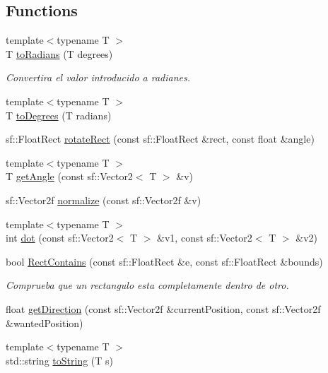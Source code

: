 \subsection*{Functions}
\begin{DoxyCompactItemize}
\item 
{\footnotesize template$<$typename T $>$ }\\T \hyperlink{namespaceant_1_1_utils_a5238d91325cffcd5d052d055767bfc36}{to\+Radians} (T degrees)
\begin{DoxyCompactList}\small\item\em Convertira el valor introducido a radianes. \end{DoxyCompactList}\item 
{\footnotesize template$<$typename T $>$ }\\T \hyperlink{namespaceant_1_1_utils_a2292728caa47103c8150e5f50d7e5bd0}{to\+Degrees} (T radians)
\item 
sf\+::\+Float\+Rect \hyperlink{namespaceant_1_1_utils_af4038d2832c96f2ce257570054bf1cae}{rotate\+Rect} (const sf\+::\+Float\+Rect \&rect, const float \&angle)
\item 
{\footnotesize template$<$typename T $>$ }\\T \hyperlink{namespaceant_1_1_utils_a9d231f01f719cafba70be1e924e4689d}{get\+Angle} (const sf\+::\+Vector2$<$ T $>$ \&v)
\item 
sf\+::\+Vector2f \hyperlink{namespaceant_1_1_utils_a412fa3ff3e1fd4c0ac6caca589e38a15}{normalize} (const sf\+::\+Vector2f \&v)
\item 
{\footnotesize template$<$typename T $>$ }\\int \hyperlink{namespaceant_1_1_utils_af61797490f8c8a4d152b5669095886e1}{dot} (const sf\+::\+Vector2$<$ T $>$ \&v1, const sf\+::\+Vector2$<$ T $>$ \&v2)
\item 
bool \hyperlink{namespaceant_1_1_utils_a95b128173f4556c262ec4e9d3df2cbfa}{Rect\+Contains} (const sf\+::\+Float\+Rect \&e, const sf\+::\+Float\+Rect \&bounds)
\begin{DoxyCompactList}\small\item\em Comprueba que un rectangulo esta completamente dentro de otro. \end{DoxyCompactList}\item 
float \hyperlink{namespaceant_1_1_utils_af65f1f5f416379049a8406f62775b798}{get\+Direction} (const sf\+::\+Vector2f \&current\+Position, const sf\+::\+Vector2f \&wanted\+Position)
\item 
{\footnotesize template$<$typename T $>$ }\\std\+::string \hyperlink{namespaceant_1_1_utils_a1b61d8737e7d43b9c1c2a99360542f50}{to\+String} (T s)

\end{DoxyCompactItemize}
